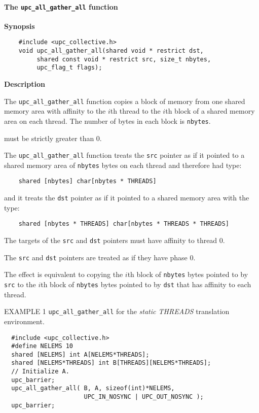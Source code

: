 \paragraph{The {\tt upc\_all\_gather\_all} function}

{\bf Synopsis} 

\npf\vspace{-2.5em} 
\begin{verbatim}
    #include <upc_collective.h>
    void upc_all_gather_all(shared void * restrict dst,
         shared const void * restrict src, size_t nbytes,
         upc_flag_t flags);
\end{verbatim}

{\bf Description} 

\np
The {\tt upc\_all\_gather\_all} function copies a block of memory from one
shared memory area with affinity to the $i$th thread to the $i$th block
of a shared memory area on each thread.
The number of bytes in each block is {\tt nbytes}.

 must be strictly greater than 0.

\np The {\tt upc\_all\_gather\_all} function treats the {\tt src} pointer
as if it pointed to a shared memory area of {\tt nbytes} bytes on each
thread and therefore had type:

\begin{verbatim}
    shared [nbytes] char[nbytes * THREADS]
\end{verbatim}  

\np and it treats the {\tt dst} pointer as if it pointed to a shared
memory area with the type:

\begin{verbatim}
    shared [nbytes * THREADS] char[nbytes * THREADS * THREADS]
\end{verbatim} 

\np The targets of the {\tt src} and {\tt dst} pointers
must have affinity to thread 0.

\np The {\tt src} and {\tt dst} pointers are treated as
if they have phase 0.

\np
The effect is equivalent to copying the
$i$th block of {\tt nbytes} bytes pointed to by {\tt src} to the
$i$th block of {\tt nbytes} bytes pointed to by {\tt dst} that
has affinity to each thread.

\np EXAMPLE 1 {\tt upc\_all\_gather\_all} for the {\em static THREADS}
translation environment.

\begin{verbatim}
  #include <upc_collective.h>
  #define NELEMS 10
  shared [NELEMS] int A[NELEMS*THREADS];
  shared [NELEMS*THREADS] int B[THREADS][NELEMS*THREADS];
  // Initialize A.
  upc_barrier;
  upc_all_gather_all( B, A, sizeof(int)*NELEMS,
                      UPC_IN_NOSYNC | UPC_OUT_NOSYNC );
  upc_barrier;
\end{verbatim}

